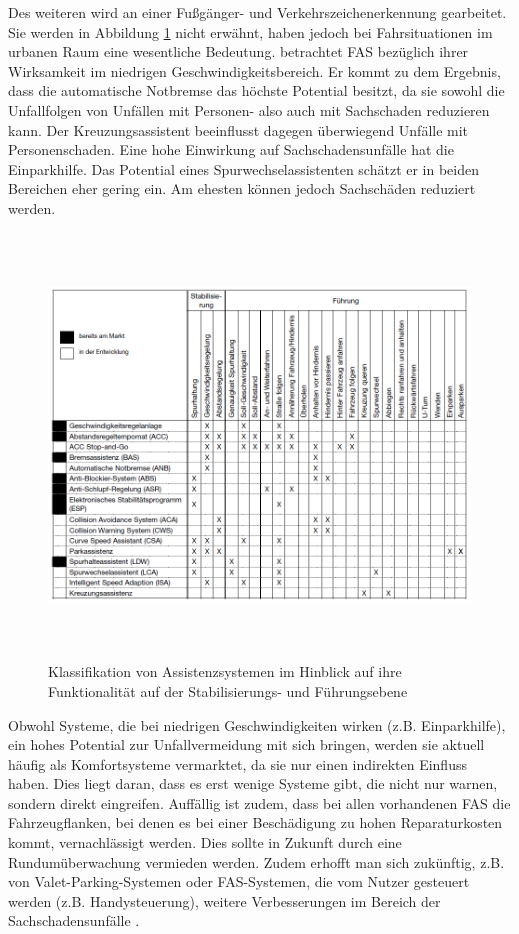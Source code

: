 Des weiteren wird an einer Fußgänger- und Verkehrszeichenerkennung gearbeitet. Sie werden in Abbildung \ref{fig:FAS} nicht erwähnt, haben jedoch bei Fahrsituationen im urbanen Raum eine wesentliche Bedeutung. \Textcite[S. 52]{Gschwendtner.2015} betrachtet \ac{FAS} bezüglich ihrer Wirksamkeit im niedrigen Geschwindigkeitsbereich. Er kommt zu dem Ergebnis, dass die automatische Notbremse das höchste Potential besitzt, da sie sowohl die Unfallfolgen von Unfällen mit Personen- also auch mit Sachschaden reduzieren kann. Der Kreuzungsassistent beeinflusst dagegen überwiegend Unfälle mit Personenschaden. Eine hohe Einwirkung auf Sachschadensunfälle hat die Einparkhilfe. Das Potential eines Spurwechselassistenten schätzt er in beiden Bereichen eher gering ein. Am ehesten können jedoch Sachschäden reduziert werden.

\begin{savenotes}
	\begin{figure}[H]
		\centering
		\includegraphics[width=15cm,height=11.25cm]{figures/FAS}
		\caption[Klassifikation von Assistenzsystemen im Hinblick auf ihre Funktionalität auf der Stabilisierungs- und Führungsebene]{Klassifikation von Assistenzsystemen im Hinblick auf ihre Funktionalität auf der Stabilisierungs- und Führungsebene \parencite[S. 31]{Vollrath.2006}}\label{fig:FAS}
	\end{figure}
\end{savenotes}

Obwohl Systeme, die bei niedrigen Geschwindigkeiten wirken (z.B. Einparkhilfe), ein hohes Potential zur Unfallvermeidung mit sich bringen, werden sie aktuell häufig als Komfortsysteme vermarktet, da sie nur einen indirekten Einfluss haben. Dies liegt daran, dass es erst wenige Systeme gibt, die nicht nur warnen, sondern direkt eingreifen. Auffällig ist zudem, dass bei allen vorhandenen \ac{FAS} die Fahrzeugflanken, bei denen es bei einer Beschädigung zu hohen Reparaturkosten kommt, vernachlässigt werden. Dies sollte in Zukunft durch eine Rundumüberwachung vermieden werden. Zudem erhofft man sich zukünftig, z.B. von Valet-Parking-Systemen oder FAS-Systemen, die vom Nutzer gesteuert werden (z.B. Handysteuerung), weitere Verbesserungen im Bereich der Sachschadensunfälle \parencite[S. 18-21]{Gschwendtner.2015}.

